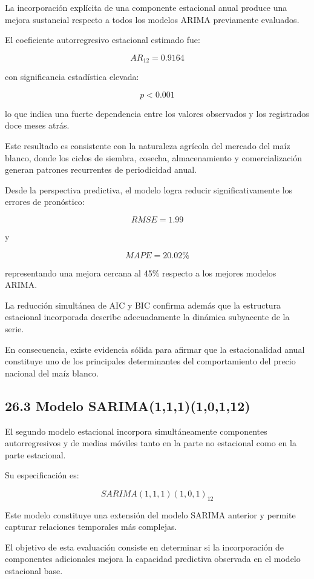 \documentclass[11pt]{article}
\begin{document}
La incorporación explícita de una componente estacional anual produce
una mejora sustancial respecto a todos los modelos ARIMA previamente
evaluados.

El coeficiente autorregresivo estacional estimado fue:

\[
AR_{12}=0.9164
\]

con significancia estadística elevada:

\[
p < 0.001
\]

lo que indica una fuerte dependencia entre los valores observados y los
registrados doce meses atrás.

Este resultado es consistente con la naturaleza agrícola del mercado del
maíz blanco, donde los ciclos de siembra, cosecha, almacenamiento y
comercialización generan patrones recurrentes de periodicidad anual.

Desde la perspectiva predictiva, el modelo logra reducir
significativamente los errores de pronóstico:

\[
RMSE = 1.99
\]

y

\[
MAPE = 20.02\%
\]

representando una mejora cercana al 45\% respecto a los mejores modelos
ARIMA.

La reducción simultánea de AIC y BIC confirma además que la estructura
estacional incorporada describe adecuadamente la dinámica subyacente de
la serie.

En consecuencia, existe evidencia sólida para afirmar que la
estacionalidad anual constituye uno de los principales determinantes del
comportamiento del precio nacional del maíz blanco.

    \hypertarget{modelo-sarima11110112}{%
\subsection{26.3 Modelo
SARIMA(1,1,1)(1,0,1,12)}\label{modelo-sarima11110112}}

El segundo modelo estacional incorpora simultáneamente componentes
autorregresivos y de medias móviles tanto en la parte no estacional como
en la parte estacional.

Su especificación es:

\[
SARIMA(1,1,1)(1,0,1)_{12}
\]

Este modelo constituye una extensión del modelo SARIMA anterior y
permite capturar relaciones temporales más complejas.

El objetivo de esta evaluación consiste en determinar si la
incorporación de componentes adicionales mejora la capacidad predictiva
observada en el modelo estacional base.
\end{document}
